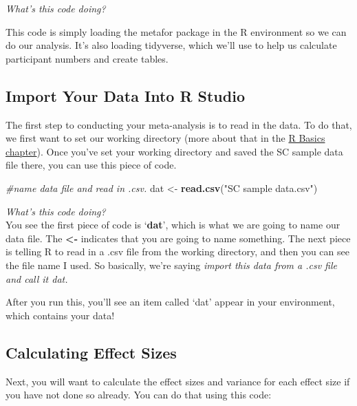 \documentclass[
]{book}
\newenvironment{Shaded}{\begin{snugshade}}{\end{snugshade}}
\newcommand{\CommentTok}[1]{\textcolor[rgb]{0.56,0.35,0.01}{\textit{#1}}}
\newcommand{\FunctionTok}[1]{\textcolor[rgb]{0.13,0.29,0.53}{\textbf{#1}}}
\newcommand{\NormalTok}[1]{#1}
\newcommand{\OtherTok}[1]{\textcolor[rgb]{0.56,0.35,0.01}{#1}}
\newcommand{\StringTok}[1]{\textcolor[rgb]{0.31,0.60,0.02}{#1}}
\begin{document}
\emph{What's this code doing?}

This code is simply loading the metafor package in the R environment so we can do our analysis. It's also loading tidyverse, which we'll use to help us calculate participant numbers and create tables.

\hypertarget{import-your-data-into-r-studio}{%
\subsection{Import Your Data Into R Studio}\label{import-your-data-into-r-studio}}

The first step to conducting your meta-analysis is to read in the data. To do that, we first want to set our working directory (more about that in the \protect\hyperlink{rbasics}{R Basics chapter}). Once you've set your working directory and saved the SC sample data file there, you can use this piece of code.

\begin{Shaded}
\begin{Highlighting}[]
\CommentTok{\#name data file and read in .csv. }
\NormalTok{dat }\OtherTok{\textless{}{-}} \FunctionTok{read.csv}\NormalTok{(}\StringTok{"SC sample data.csv"}\NormalTok{)}
\end{Highlighting}
\end{Shaded}

\emph{What's this code doing?\\
}You see the first piece of code is `\textbf{dat}', which is what we are going to name our data file. The \textbf{\textless-} indicates that you are going to name something. The next piece is telling R to read in a .csv file from the working directory, and then you can see the file name I used. So basically, we're saying \emph{import this data from a .csv file and call it dat.}

After you run this, you'll see an item called `dat' appear in your environment, which contains your data!

\hypertarget{calculating-effect-sizes}{%
\subsection{Calculating Effect Sizes}\label{calculating-effect-sizes}}

Next, you will want to calculate the effect sizes and variance for each effect size if you have not done so already. You can do that using this code:
\end{document}
